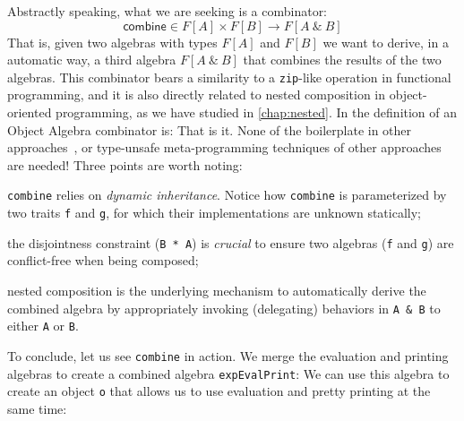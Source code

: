 Abstractly speaking, what we are seeking is a combinator:
\[
  \mathsf{combine} \in F[A] \times F[B] \rightarrow F[A\ \&\ B]
\]
That is, given two algebras with types $F[A]$ and $F[B]$ we want to
derive, in a automatic way, a third algebra $F[A\ \&\ B]$ that combines the results
of the two algebras. This combinator bears a similarity to a
\lstinline{zip}-like operation in functional programming, and it is also directly
related to nested composition in object-oriented programming, as we have studied
in \cref{chap:nested}. In \sedel the definition of an Object Algebra combinator is:
That is it. None of the boilerplate in other
approaches~\citep{oliveira2012extensibility}, or type-unsafe meta-programming
techniques of other approaches~\citep{oliveira2013feature,rendel14attributes} are
needed! Three points are worth noting:
\begin{inparaenum}[(1)]
\item \lstinline{combine} relies on \emph{dynamic inheritance}. Notice how
  \lstinline{combine} is parameterized by two traits \lstinline{f} and \lstinline{g}, for
  which their implementations are unknown statically;
\item the disjointness constraint (\lstinline{B * A}) is \emph{crucial} to
  ensure two algebras (\lstinline{f} and \lstinline{g}) are conflict-free
  when being composed;
\item nested composition is the underlying mechanism to automatically derive the
  combined algebra by appropriately invoking (delegating) behaviors in \lstinline{A & B} to either \lstinline{A} or \lstinline{B}.
\end{inparaenum}

To conclude, let us see \lstinline{combine} in action. We merge the evaluation
and printing algebras to create a combined algebra \lstinline{expEvalPrint}:
We can use this algebra to create an object \lstinline{o} that allows us to use
evaluation and pretty printing at the same time:




